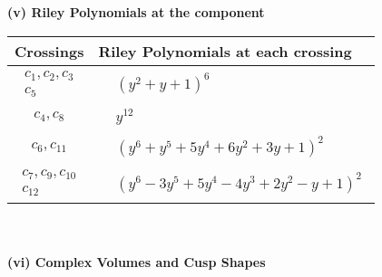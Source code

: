 \documentclass[1p]{elsarticle_modified}
\theoremstyle{definition}
\begin{document}
\newpage\renewcommand{\arraystretch}{1}
\flushleft \textbf{(v) Riley Polynomials at the component}\newline \\
\begin{tabular}{m{50pt}|m{274pt}}
Crossings & \hspace{64pt}Riley Polynomials at each crossing \\
\hline $$\begin{aligned}c_{1},c_{2},c_{3}\\c_{5}\end{aligned}$$&$\begin{aligned}
&(y^2+y+1)^6
\end{aligned}$\\
\hline $$\begin{aligned}c_{4},c_{8}\end{aligned}$$&$\begin{aligned}
&y^{12}
\end{aligned}$\\
\hline $$\begin{aligned}c_{6},c_{11}\end{aligned}$$&$\begin{aligned}
&(y^6+y^5+5 y^4+6 y^2+3 y+1)^2
\end{aligned}$\\
\hline $$\begin{aligned}c_{7},c_{9},c_{10}\\c_{12}\end{aligned}$$&$\begin{aligned}
&(y^6-3 y^5+5 y^4-4 y^3+2 y^2- y+1)^2
\end{aligned}$\\
\hline
\end{tabular}\\~\\
\newpage\flushleft \textbf{(vi) Complex Volumes and Cusp Shapes}
\end{document}
